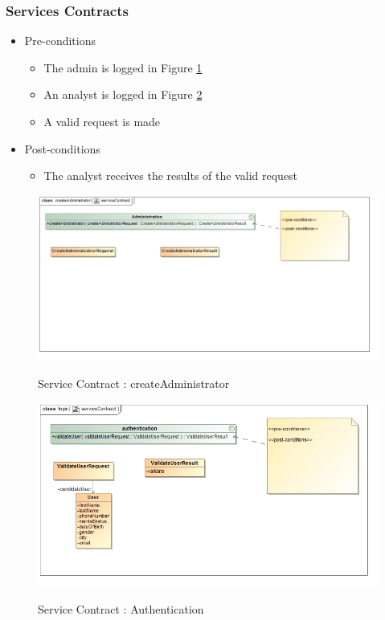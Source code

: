 \documentclass{article}
\begin{document}
		\subsubsection{Services Contracts}
		\begin{itemize}
			\item Pre-conditions
				\begin{itemize}
					\item The admin is logged in Figure \ref{fig:createAdmin}
					\item An analyst is logged in Figure \ref{fig:authentication}
					\item A valid request is made
				\end{itemize}
			\item Post-conditions
				\begin{itemize}
					\item The analyst receives the results of the valid request
				\end{itemize}
		\end{itemize}
		\begin{figure}[H]
		\includegraphics[width=\textwidth]{images/class__createAdministrator__serviceContract.jpg}  \\
		\caption{Service Contract : createAdministrator}
		\label{fig:createAdmin}
		\end{figure}
		
		\begin{figure}[H]
		\includegraphics[width=\textwidth]{images/class__login__serviceContract.jpg}  \\
		\caption{Service Contract : Authentication}
		\label{fig:authentication}
		\end{figure}
\end{document}
